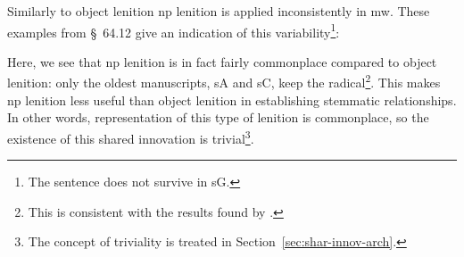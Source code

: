 Similarly to object lenition \gls{np} lenition is applied inconsistently in \gls{mw}. These examples from  §~64.12 give an indication of this variability\footnote{The sentence does not survive in \gls{sG}.}:
\begin{mwl}
\end{mwl}
Here, we see that \gls{np} lenition is in fact fairly commonplace compared to object lenition: only the oldest manuscripts, \gls{sA} and \gls{sC}, keep the radical\footnote{This is consistent with the results found by \textcite{van_development14}.}. This makes \gls{np} lenition less useful than object lenition in establishing stemmatic relationships. In other words, representation of this type of lenition is commonplace, so the existence of this shared innovation is trivial\footnote{The concept of triviality is treated in Section~\ref{sec:shar-innov-arch}.}.




